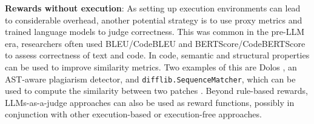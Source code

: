 \textbf{Rewards without execution}: As setting up execution environments can lead to considerable overhead, another potential strategy is to use proxy metrics and trained language models to judge correctness. This was common in the pre-LLM era, researchers often used BLEU/CodeBLEU \citep{papineni2002bleu, ren2020codebleu} and BERTScore/CodeBERTScore \citep{zhang2019bertscore, zhou2023codebertscore} to assess correctness of text and code. In code, semantic and structural properties can be used to improve similarity metrics. Two examples of this are Dolos \citep{maertens2022dolos}, an AST-aware plagiarism detector, and \texttt{difflib.SequenceMatcher}, which can be used to compute the similarity between two patches \citep{wei2025swerladvancingllmreasoning, ma2025sorft}. 
Beyond rule-based rewards, LLMs-as-a-judge approaches can also be used as reward functions, possibly in conjunction with other execution-based or execution-free approaches.





